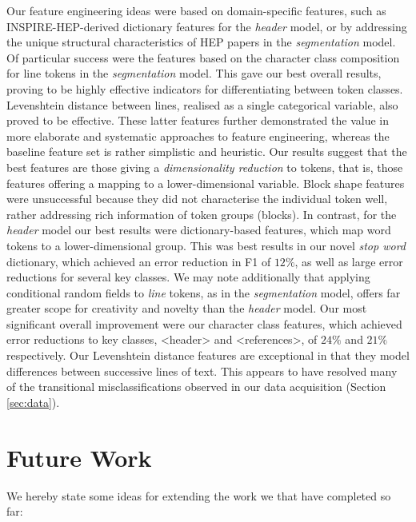 Our feature engineering ideas were based on domain-specific features, such as INSPIRE-HEP-derived dictionary features for the \emph{header} model, or by addressing the unique structural characteristics of HEP papers in the \emph{segmentation} model. Of particular success were the features based on the character class composition for line tokens in the \emph{segmentation} model. This gave our best overall results, proving to be highly effective indicators for differentiating between token classes. Levenshtein distance between lines, realised as a single categorical variable, also proved to be effective. These latter features further demonstrated the value in more elaborate and systematic approaches to feature engineering, whereas the baseline feature set is rather simplistic and heuristic. Our results suggest that the best features are those giving a \emph{dimensionality reduction} to tokens, that is, those features offering a mapping to a lower-dimensional variable. Block shape features were unsuccessful because they did not characterise the individual token well, rather addressing rich information of token groups (blocks). In contrast, for the \emph{header} model our best results were dictionary-based features, which map word tokens to a lower-dimensional group. This was best results in our novel \emph{stop word} dictionary, which achieved an error reduction in F1 of $12\%$, as well as large error reductions for several key classes. We may note additionally that applying conditional random fields to \emph{line} tokens, as in the \emph{segmentation} model, offers far greater scope for creativity and novelty than the \emph{header} model. Our most significant overall improvement were our character class features, which achieved error reductions to key classes, <header> and <references>, of $24\%$ and $21\%$ respectively. Our Levenshtein distance features are exceptional in that they model differences between successive lines of text. This appears to have resolved many of the transitional misclassifications observed in our data acquisition (Section \ref{sec:data}).

\section{Future Work}
\label{sec:futurework}

We hereby state some ideas for extending the work we that have completed so far:

